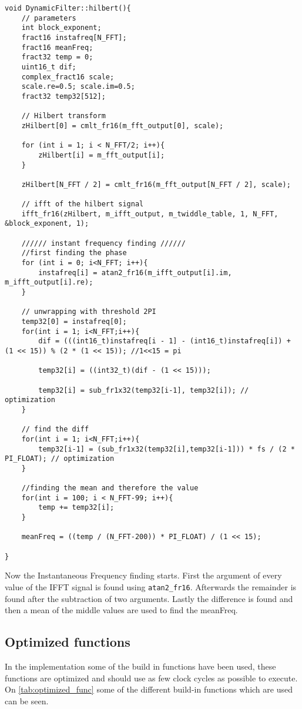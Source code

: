\begin{verbatim}
void DynamicFilter::hilbert(){
	// parameters
	int block_exponent;
	fract16 instafreq[N_FFT];
	fract16 meanFreq;
	fract32 temp = 0;
	uint16_t dif;
	complex_fract16 scale;
	scale.re=0.5; scale.im=0.5;
	fract32 temp32[512];
			
	// Hilbert transform
	zHilbert[0] = cmlt_fr16(m_fft_output[0], scale);
	
	for (int i = 1; i < N_FFT/2; i++){
		zHilbert[i] = m_fft_output[i];
	}
		
	zHilbert[N_FFT / 2] = cmlt_fr16(m_fft_output[N_FFT / 2], scale);
	
	// ifft of the hilbert signal
	ifft_fr16(zHilbert, m_ifft_output, m_twiddle_table, 1, N_FFT, &block_exponent, 1);
		
	////// instant frequency finding //////
	//first finding the phase
	for (int i = 0; i<N_FFT; i++){
		instafreq[i] = atan2_fr16(m_ifft_output[i].im, m_ifft_output[i].re);
	}
	
	// unwrapping with threshold 2PI
	temp32[0] = instafreq[0];
	for(int i = 1; i<N_FFT;i++){
		dif = (((int16_t)instafreq[i - 1] - (int16_t)instafreq[i]) + (1 << 15)) % (2 * (1 << 15)); //1<<15 = pi
		
		temp32[i] = ((int32_t)(dif - (1 << 15)));
			
		temp32[i] = sub_fr1x32(temp32[i-1],	temp32[i]); // optimization
	}
		
	// find the diff
	for(int i = 1; i<N_FFT;i++){
		temp32[i-1] = (sub_fr1x32(temp32[i],temp32[i-1])) * fs / (2 * PI_FLOAT); // optimization
	}
		
	//finding the mean and therefore the value
	for(int i = 100; i < N_FFT-99; i++){
		temp += temp32[i];
	}
		
	meanFreq = ((temp / (N_FFT-200)) * PI_FLOAT) / (1 << 15);
		
}
\end{verbatim}
Now the Instantaneous Frequency finding starts. First the argument of every value of the IFFT signal is found using \texttt{atan2_fr16}.
Afterwards the remainder is found after the subtraction of two arguments.
Lastly the difference is found and then a mean of the middle values are used to find the meanFreq.

\subsection{Optimized functions}
In the implementation some of the build in functions have been used, these functions are optimized and should use as few clock cycles as possible to execute.
On \cref{tab:optimized_func}  some of the different build-in functions which are used can be seen.

